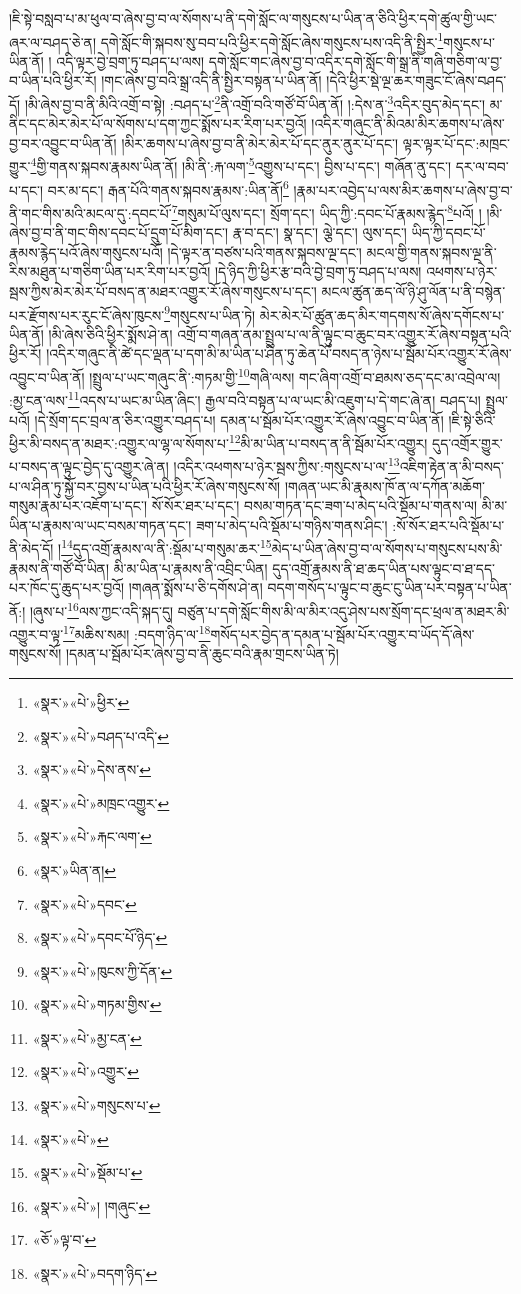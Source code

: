 །ཇི་སྟེ་བསླབ་པ་མ་ཕུལ་བ་ཞེས་བྱ་བ་ལ་སོགས་པ་ནི་དགེ་སློང་ལ་གསུངས་པ་ཡིན་ན་ཅིའི་ཕྱིར་དགེ་ཚུལ་གྱི་ཡང་ཞར་ལ་བཤད་ཅེ་ན། དགེ་སློང་གི་སྐབས་སུ་བབ་པའི་ཕྱིར་དགེ་སློང་ཞེས་གསུངས་པས་འདི་ནི་སྤྱིར་\footnote{«སྣར་»«པེ་»ཕྱིར་}གསུངས་པ་ཡིན་ནོ། །
འདི་ལྟར་བྱེ་བྲག་ཏུ་བཤད་པ་ལས། དགེ་སློང་གང་ཞེས་བྱ་བ་འདིར་དགེ་སློང་གི་སྒྲ་ནི་གཞི་གཅིག་ལ་བྱ་བ་ཡིན་པའི་ཕྱིར་རོ། །གང་ཞེས་བྱ་བའི་སྒྲ་འདི་ནི་སྤྱིར་བསྟན་པ་ཡིན་ནོ། །དེའི་ཕྱིར་སྡེ་ལྔ་ཆར་གཟུང་ངོ་ཞེས་བཤད་དོ། །མི་ཞེས་བྱ་བ་ནི་མིའི་འགྲོ་བ་སྟེ། :བཤད་པ་\footnote{«སྣར་»«པེ་»བཤད་པ་འདི་}ནི་འགྲོ་བའི་གཙོ་བོ་ཡིན་ནོ། །:དེས་ན་\footnote{«སྣར་»«པེ་»དེས་ནས་}འདིར་བུད་མེད་དང་། མ་ནིང་དང་མེར་མེར་པོ་ལ་སོགས་པ་དག་ཀྱང་སྨོས་པར་རིག་པར་བྱའོ། །འདིར་གཞུང་ནི་མིའམ་མིར་ཆགས་པ་ཞེས་བྱ་བར་འབྱུང་བ་ཡིན་ནོ། །མིར་ཆགས་པ་ཞེས་བྱ་བ་ནི་མེར་མེར་པོ་དང་ནུར་ནུར་པོ་དང་། ལྟར་ལྟར་པོ་དང་:མཁྲང་གྱུར་\footnote{«སྣར་»«པེ་»མཁྲང་འགྱུར་}གྱི་གནས་སྐབས་རྣམས་ཡིན་ནོ། །མི་ནི་:རྐ་ལག་\footnote{«སྣར་»«པེ་»རྐང་ལག་}འགྱུས་པ་དང་། བྱིས་པ་དང་། གཞོན་ནུ་དང་། དར་ལ་བབ་པ་དང་། བར་མ་དང་། རྒན་པོའི་གནས་སྐབས་རྣམས་:ཡིན་ནོ།\footnote{«སྣར་»ཡིན་ན།} །རྣམ་པར་འབྱེད་པ་ལས་མིར་ཆགས་པ་ཞེས་བྱ་བ་ནི་གང་གིས་མའི་མངལ་དུ་:དབང་པོ་\footnote{«སྣར་»«པེ་»དབང་}གསུམ་པོ་ལུས་དང་། སྲོག་དང་། ཡིད་ཀྱི་:དབང་པོ་རྣམས་རྙེད་\footnote{«སྣར་»«པེ་»དབང་པོ་ཉིད་}པའོ། ། །མི་ཞེས་བྱ་བ་ནི་གང་གིས་དབང་པོ་དྲུག་པོ་མིག་དང་། རྣ་བ་དང་། སྣ་དང་། ལྕེ་དང་། ལུས་དང་། ཡིད་ཀྱི་དབང་པོ་རྣམས་རྙེད་པའོ་ཞེས་གསུངས་པའོ། །དེ་ལྟར་ན་བཙས་པའི་གནས་སྐབས་ལྔ་དང་། མངལ་གྱི་གནས་སྐབས་ལྔ་ནི་རིས་མཐུན་པ་གཅིག་ཡིན་པར་རིག་པར་བྱའོ། །དེ་ཉིད་ཀྱི་ཕྱིར་རྩ་བའི་བྱེ་བྲག་ཏུ་བཤད་པ་ལས། འཕགས་པ་ཉེར་སྦས་ཀྱིས་མེར་མེར་པོ་བསད་ན་མཐར་འགྱུར་རོ་ཞེས་གསུངས་པ་དང་། མངལ་ཚུན་ཆད་ལོ་ཉི་ཤུ་ལོན་པ་ནི་བསྙེན་པར་རྫོགས་པར་རུང་ངོ་ཞེས་ཁུངས་\footnote{«སྣར་»«པེ་»ཁུངས་ཀྱི་དོན་}གསུངས་པ་ཡིན་ཏེ། མེར་མེར་པོ་ཚུན་ཆད་མིར་གདགས་སོ་ཞེས་དགོངས་པ་ཡིན་ནོ། །མི་ཞེས་ཅིའི་ཕྱིར་སྨོས་ཤེ་ན། འགྲོ་བ་གཞན་ནམ་སྤྲུལ་པ་ལ་ནི་ལྟུང་བ་ཆུང་བར་འགྱུར་རོ་ཞེས་བསྟན་པའི་ཕྱིར་རོ། །འདིར་གཞུང་ནི་ཚེ་དང་ལྡན་པ་དག་མི་མ་ཡིན་པ་ཤིན་ཏུ་ཆེན་པོ་བསད་ན་ཉེས་པ་སྦོམ་པོར་འགྱུར་རོ་ཞེས་འབྱུང་བ་ཡིན་ནོ། །སྤྲུལ་པ་ཡང་གཞུང་ནི་:གཏམ་གྱི་\footnote{«སྣར་»«པེ་»གཏམ་གྱིས་}གཞི་ལས། གང་ཞིག་འགྲོ་བ་ཐམས་ཅད་དང་མ་འབྲེལ་ལ། :མྱ་ངན་ལས་\footnote{«སྣར་»«པེ་»མྱ་ངན་}འདས་པ་ཡང་མ་ཡིན་ཞིང་། རྒྱལ་བའི་བསྟན་པ་ལ་ཡང་མི་འཇུག་པ་དེ་གང་ཞེ་ན། བཤད་པ། སྤྲུལ་པའོ། །དེ་སྲོག་དང་བྲལ་ན་ཅིར་འགྱུར་བཤད་པ། དམན་པ་སྦོམ་པོར་འགྱུར་རོ་ཞེས་འབྱུང་བ་ཡིན་ནོ། །ཇི་སྟེ་ཅིའི་ཕྱིར་མི་བསད་ན་མཐར་:འགྱུར་ལ་ལྷ་ལ་སོགས་པ་\footnote{«སྣར་»«པེ་»འགྱུར་}མི་མ་ཡིན་པ་བསད་ན་ནི་སྦོམ་པོར་འགྱུར། དུད་འགྲོར་གྱུར་པ་བསད་ན་ལྟུང་བྱེད་དུ་འགྱུར་ཞེ་ན། །འདིར་འཕགས་པ་ཉེར་སྦས་ཀྱིས་:གསུངས་པ་ལ་\footnote{«སྣར་»«པེ་»གསུངས་པ་}འཇིག་རྟེན་ན་མི་བསད་པ་ལ་ཤིན་ཏུ་སྐྱོ་བར་བྱས་པ་ཡིན་པའི་ཕྱིར་རོ་ཞེས་གསུངས་སོ། །གཞན་ཡང་མི་རྣམས་ཁོ་ན་ལ་དཀོན་མཆོག་གསུམ་རྣམ་པར་འཇོག་པ་དང་། སོ་སོར་ཐར་པ་དང་། བསམ་གཏན་དང་ཟག་པ་མེད་པའི་སྡོམ་པ་གནས་ལ། མི་མ་ཡིན་པ་རྣམས་ལ་ཡང་བསམ་གཏན་དང་། ཟག་པ་མེད་པའི་སྡོམ་པ་གཉིས་གནས་ཤིང་། :སོ་སོར་ཐར་པའི་སྡོམ་པ་ནི་མེད་དོ། །\footnote{«སྣར་»«པེ་»}དུད་འགྲོ་རྣམས་ལ་ནི་:སྡོམ་པ་གསུམ་ཆར་\footnote{«སྣར་»«པེ་»སྡོམ་པ་}མེད་པ་ཡིན་ཞེས་བྱ་བ་ལ་སོགས་པ་གསུངས་པས་མི་རྣམས་ནི་གཙོ་བོ་ཡིན། མི་མ་ཡིན་པ་རྣམས་ནི་འབྲིང་ཡིན། དུད་འགྲོ་རྣམས་ནི་ཐ་ཆད་ཡིན་པས་ལྟུང་བ་ཐ་དད་པར་ཁོང་དུ་ཆུད་པར་བྱའོ། །གཞན་སྨོས་པ་ཅི་དགོས་ཤེ་ན། བདག་གསོད་པ་ལྟུང་བ་ཆུང་ངུ་ཡིན་པར་བསྟན་པ་ཡིན་ནོ:། །ཞུས་པ་\footnote{«སྣར་»«པེ་»། །གཞུང་}ལས་ཀྱང་འདི་སྐད་དུ། བཙུན་པ་དགེ་སློང་གིས་མི་ལ་མིར་འདུ་ཤེས་པས་སྲོག་དང་ཕྲལ་ན་མཐར་མི་འགྱུར་བ་ལྟ་\footnote{«ཅོ་»ལྟ་བ་}མཆིས་སམ། :བདག་ཉིད་ལ་\footnote{«སྣར་»«པེ་»བདག་ཉིད་}གསོད་པར་བྱེད་ན་དམན་པ་སྦོམ་པོར་འགྱུར་བ་ཡོད་དོ་ཞེས་གསུངས་སོ། །དམན་པ་སྦོམ་པོར་ཞེས་བྱ་བ་ནི་ཆུང་བའི་རྣམ་གྲངས་ཡིན་ཏེ། 